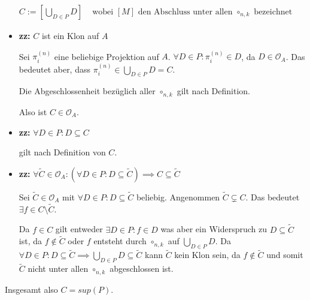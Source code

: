 \documentclass[]{article}
\begin{document}
\begin{align*}
	C:= \left[\bigcup_{D\in P}D\right] & \text{ wobei } [M] \text{ den Abschluss unter allen } \circ_{n,k} \text{ bezeichnet}
\end{align*}

\begin{itemize}
	\item \textbf{zz: } $C$ ist ein Klon auf $A$
	
	Sei $\pi_i^{(n)}$ eine beliebige Projektion auf $A$. $\forall D \in P: \pi_i^{(n)} \in D$, da $D \in \mathcal{O}_A$. Das bedeutet aber, dass $\pi_i^{(n)} \in \bigcup_{D\in P}D = C$.
	
	Die Abgeschlossenheit bezüglich aller $\circ_{n,k}$ gilt nach Definition.
	
	Also ist $C \in \mathcal{O}_A$.
	
	\item \textbf{zz: } $\forall D \in P: D \subseteq C$
	
	gilt nach Definition von $C$.
	
	\item \textbf{zz: } $\forall \tilde{C} \in \mathcal{O}_A:(\forall D \in P: D \subseteq \tilde{C}) \implies C \subseteq \tilde{C}$
	
	Sei $\tilde{C} \in \mathcal{O}_A$ mit $\forall D \in P: D \subseteq \tilde{C}$ beliebig. Angenommen $\tilde{C} \subsetneq C$. Das bedeutet $\exists f \in C \setminus \tilde{C}$.
	
	Da $f \in C$ gilt entweder $\exists D \in P: f \in D$ was aber ein Widerspruch zu $D \subseteq \tilde{C}$ ist, da $f \notin \tilde{C}$ oder
	$f$ entsteht durch $\circ_{n,k}$ auf $\bigcup_{D\in P}D$. Da $\forall D \in P: D \subseteq \tilde{C} \implies \bigcup_{D\in P}D \subseteq \tilde{C}$ kann $\tilde{C}$ kein Klon sein, da $f \notin \tilde{C}$ und somit $\tilde{C}$ nicht unter allen $\circ_{n,k}$ abgeschlossen ist.
\end{itemize}

Insgesamt also $C = sup(P)$.


\newpage
\end{document}
